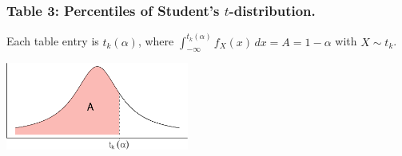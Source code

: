 \documentclass[
]{article}
\begin{document}
\newpage

\hypertarget{table-3-percentiles-of-students-t-distribution.}{%
\subsubsection{\texorpdfstring{Table 3: Percentiles of Student's
\(t\)-distribution.}{Table 3: Percentiles of Student's t-distribution.}}\label{table-3-percentiles-of-students-t-distribution.}}

Each table entry is \(t_k(\alpha)\), where
\(\int_{-\infty}^{t_k(\alpha)}f_X(x) \, dx = A = 1-\alpha\) with
\(X\sim t_k\).

\begin{center}\includegraphics[width=6cm]{figure/unnamed-chunk-4-1} \end{center}
\end{document}
